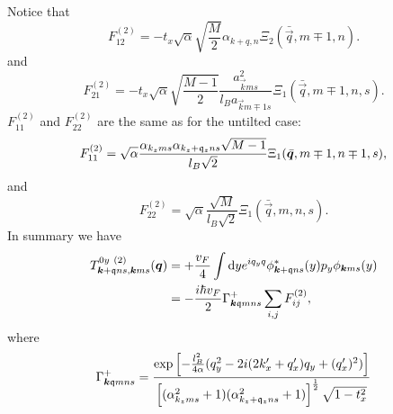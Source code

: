 Notice that
\begin{equation}
  F^{(2)}_{12}
  = -t_x \sqrt{\alpha}  \sqrt{\frac{M}{2}} \alpha_{k+q, n} \Xi_2(\bar{\vec{q}}, m\mp 1, n).
\end{equation}
and
\begin{equation}
  \label{eq:122}
  F^{(2)}_{21}
  =
  -t_{x} \sqrt{\alpha} \sqrt{\frac{M-1}{2}} \frac{a_{\vec{k} m s}^2}{l_B a_{\vec{k} m \mp 1 s}}
  \Xi_{1} (\bar{\vec{q}}, m \mp 1, n, s).
\end{equation}
\( F^{(2)}_{11} \) and \( F^{(2)}_{22} \) are the same as for the untilted case:
\begin{equation}
  \label{eq:123}
  F^{(2)}_{11} = \sqrt{\alpha}  \frac{\alpha_{k_z m s} \alpha_{k_z + \mathfrak{q}_z ns} \sqrt{M-1} }{ l_B \sqrt{2} }
  \Xi_{1} (\bar{\bm{q}}, m\mp 1, n\mp 1, s),
\end{equation}
and
\begin{equation}
  \label{eq:124}
  F^{(2)}_{22} =
  \sqrt{\alpha }
  \frac{\sqrt{M} }{l_B \sqrt{2} }
  \Xi_{1} ( \bar{\vec{q}}, m, n, s ).
\end{equation}
In summary we have
\begin{align}
  \label{eq:125}
  T^{0y~(2)}_{\bm{k} + \mathfrak{q} ns, \bm{k} ms} (\bm{q}) &= + \frac{v_F}{4} \int \mathrm{d} y
  e^{i q_y q} \phi _{\bm{k} + \mathfrak{q} ns}^{*} (y) p_{y} \phi _{\bm{k} ms} (y)\\
&= -\frac{ i \hbar v_{F} }{2}
                                                                                     \Gamma _{\bm{k} \mathfrak{q} m n s}^+
\sum\limits_{i,j}^{} F^{(2)}_{ij},
\end{align}
where
\[
  \Gamma _{\bm{k} \mathfrak{q} m n s}^+ =
  \frac{
  \exp
  \left[
    - \frac{l_{B}^2}{4 \alpha } (q_{y}^2 - 2 i (2k' _x + q' _x) q_{y} + (q' _x)^2 )
  \right  ]
}{
  \left[(\alpha_{k_z m s}^2 +1) (\alpha_{k_z + \mathfrak{q}_z ns} ^2 + 1)\right]^{\frac{1}{2}}
  \sqrt{1 - t_x^2 }}
\]

